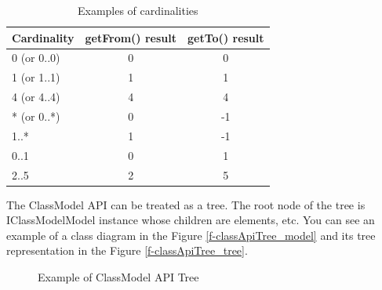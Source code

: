 \begin{table}[!ht]
\begin{center}
\begin{tabular}{|l|c|c|}
	\hline
	{ \bf Cardinality } & { \bf getFrom() result } & { \bf getTo() result } \\
	\hline \hline
	0 (or 0..0)      & 0 & 0  \\
	1 (or 1..1)      & 1 & 1  \\
   4 (or 4..4)      & 4 & 4  \\
	* (or 0..*)      & 0 & -1 \\
	1..*             & 1 & -1 \\
   0..1             & 0 & 1  \\
   2..5             & 2 & 5  \\
	\hline
\end{tabular}
\caption{Examples of cardinalities}
\label{tab:cardinalityExamples}
\end{center}
\end{table}

The ClassModel API can be treated as a tree. The root node of the tree is IClassModelModel instance whose children are elements, etc. You can see an example of a class diagram in the Figure \ref{f-classApiTree_model} and its tree representation in the Figure \ref{f-classApiTree_tree}.

\begin{figure}[!ht]
\begin{center}
\caption{Example of ClassModel API Tree}
\label{f-classApiTree}
\end{center}
\end{figure}

